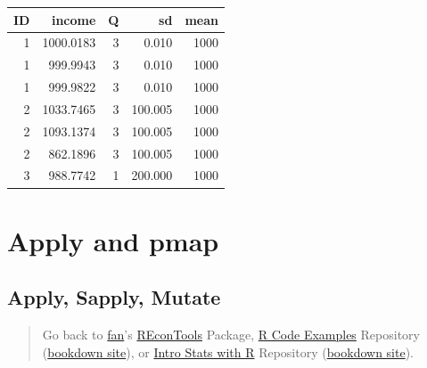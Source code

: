 \documentclass[
]{book}
\newenvironment{Shaded}{\begin{snugshade}}{\end{snugshade}}
\newcommand{\KeywordTok}[1]{\textcolor[rgb]{0.13,0.29,0.53}{\textbf{#1}}}
\newcommand{\NormalTok}[1]{#1}
\newcommand{\OperatorTok}[1]{\textcolor[rgb]{0.81,0.36,0.00}{\textbf{#1}}}
\newcommand{\StringTok}[1]{\textcolor[rgb]{0.31,0.60,0.02}{#1}}
\begin{document}
\begin{Shaded}
\end{Shaded}

\begin{table}[!h]
\centering
\begin{tabular}{r|r|r|r|r}
\hline
ID & income & Q & sd & mean\\
\hline
\rowcolor{gray!6}  1 & 1000.0183 & 3 & 0.010 & 1000\\
\hline
1 & 999.9943 & 3 & 0.010 & 1000\\
\hline
\rowcolor{gray!6}  1 & 999.9822 & 3 & 0.010 & 1000\\
\hline
2 & 1033.7465 & 3 & 100.005 & 1000\\
\hline
\rowcolor{gray!6}  2 & 1093.1374 & 3 & 100.005 & 1000\\
\hline
2 & 862.1896 & 3 & 100.005 & 1000\\
\hline
\rowcolor{gray!6}  3 & 988.7742 & 1 & 200.000 & 1000\\
\hline
\end{tabular}
\end{table}

\hypertarget{apply-and-pmap}{%
\section{Apply and pmap}\label{apply-and-pmap}}

\hypertarget{apply-sapply-mutate}{%
\subsection{Apply, Sapply, Mutate}\label{apply-sapply-mutate}}

\begin{quote}
Go back to \href{http://fanwangecon.github.io/}{fan}'s \href{https://fanwangecon.github.io/REconTools/}{REconTools} Package, \href{https://fanwangecon.github.io/R4Econ/}{R Code Examples} Repository (\href{https://fanwangecon.github.io/R4Econ/bookdown}{bookdown site}), or \href{https://fanwangecon.github.io/Stat4Econ/}{Intro Stats with R} Repository (\href{https://fanwangecon.github.io/Stat4Econ/bookdown}{bookdown site}).
\end{quote}
\end{document}

